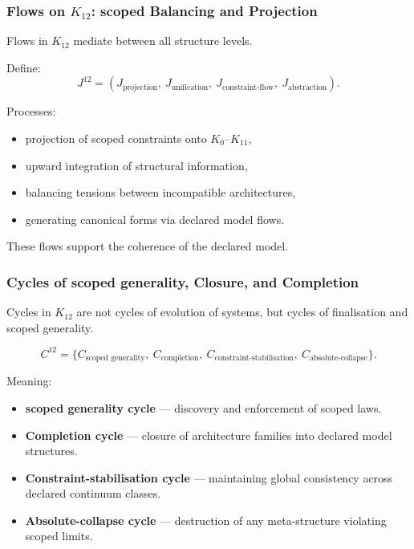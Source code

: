 \subsubsection{Flows on $K_{12}$: scoped Balancing and Projection}

Flows in $K_{12}$ mediate between all structure levels.

Define:
\[
J^{12} =
(J_{\text{projection}},\ J_{\text{unification}},\
 J_{\text{constraint-flow}},\ J_{\text{abstraction}}).
\]

Processes:
\begin{itemize}
    \item projection of scoped constraints onto $K_0$--$K_{11}$,
    \item upward integration of structural information,
    \item balancing tensions between incompatible architectures,
    \item generating canonical forms via declared model flows.
\end{itemize}

These flows support the coherence of the declared model.

\subsubsection{Cycles of scoped generality, Closure, and Completion}

Cycles in $K_{12}$ are not cycles of evolution of systems,
but cycles of finalisation and scoped generality.

\[
C^{12} = \{
C_{\text{scoped generality}},\
C_{\text{completion}},\
C_{\text{constraint-stabilisation}},\
C_{\text{absolute-collapse}}
\}.
\]

Meaning:
\begin{itemize}
    \item \textbf{scoped generality cycle}
      --- discovery and enforcement of scoped laws.

    \item \textbf{Completion cycle}
      --- closure of architecture families into declared model structures.

    \item \textbf{Constraint-stabilisation cycle}
      --- maintaining global consistency across declared continuum classes.

    \item \textbf{Absolute-collapse cycle}
      --- destruction of any meta-structure violating scoped limits.
\end{itemize}


